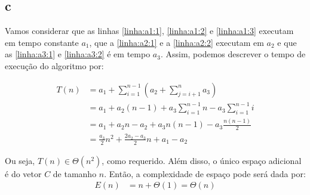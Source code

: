 \itemdsep
\subsection{c}

Vamos considerar que as linhas \ref{linha:a1:1}, \ref{linha:a1:2} e \ref{linha:a1:3} executam em tempo constante $a_1$, que a \ref{linha:a2:1} e a \ref{linha:a2:2} executam em $a_2$ e que as \ref{linha:a3:1} e \ref{linha:a3:2} é em tempo $a_3$. Assim, podemos descrever o tempo de execução do algoritmo por:

\begin{align*}
    T(n) &= a_1 + \sum_{i = 1}^{n - 1}\left(a_2 + \sum_{j = i + 1}^n a_3\right) \\
    &= a_1 + a_2 (n - 1) + a_3 \sum_{i = 1}^{n - 1} n - a_3 \sum_{i = 1}^{n - 1} i \\
    &= a_1 + a_2 n - a_2 + a_3 n (n - 1) - a_3 \frac{n (n - 1)}{2} \\
    &= \frac{a_3}{2} n^2 + \frac{2 a_2 - a_3}{2} n + a_1 - a_2
\end{align*}

Ou seja, $T(n) \in \Theta\left(n^2\right)$, como requerido. Além disso, o único espaço adicional é do vetor $C$ de tamanho $n$. Então, a complexidade de espaço pode será dada por:
\begin{align*}
    E(n) &= n + \Theta(1) = \Theta(n)
\end{align*}
